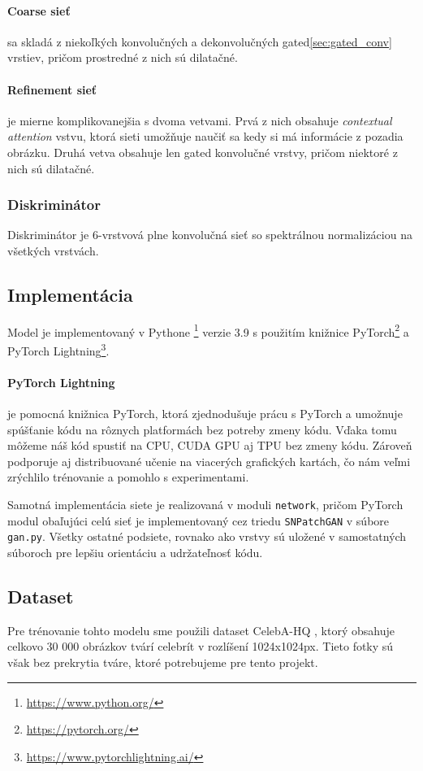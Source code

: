 \documentclass [11pt, a4paper]{article}
\begin{document}
	\paragraph{Coarse sieť} sa skladá z niekoľkých konvolučných a dekonvolučných gated\ref{sec:gated_conv} vrstiev, pričom prostredné z nich sú dilatačné.
	\paragraph{Refinement sieť} je mierne komplikovanejšia s dvoma vetvami. Prvá z nich obsahuje \textit{contextual attention} \cite{yu2018generative} vstvu, ktorá sieti umožňuje naučiť sa kedy si má  informácie z pozadia obrázku. Druhá vetva obsahuje len gated konvolučné vrstvy, pričom niektoré z nich sú dilatačné.
	
	\subsubsection{Diskriminátor}\label{sec:discriminator}
	Diskriminátor je 6-vrstvová plne konvolučná sieť so spektrálnou normalizáciou na všetkých vrstvách. 
	
	\subsection{Implementácia}
	Model je implementovaný v Pythone \footnote{\url{https://www.python.org/}} verzie 3.9 s použitím knižnice PyTorch\footnote{\url{https://pytorch.org/}} a PyTorch Lightning\footnote{\url{https://www.pytorchlightning.ai/}}.
	
	\paragraph{PyTorch Lightning} je pomocná knižnica PyTorch, ktorá zjednodušuje prácu s PyTorch a umožnuje spúšťanie kódu na rôznych platformách bez potreby zmeny kódu. Vďaka tomu môžeme náš kód spustiť na CPU, CUDA GPU aj TPU bez zmeny kódu. Zároveň podporuje aj distribuované učenie na viacerých grafických kartách, čo nám veľmi zrýchlilo trénovanie a pomohlo s experimentami.
	
	Samotná implementácia siete je realizovaná v moduli \texttt{network}, pričom PyTorch modul obaľujúci celú sieť je implementovaný cez triedu \texttt{SNPatchGAN} v súbore \texttt{gan.py}. Všetky ostatné podsiete, rovnako ako vrstvy sú uložené v samostatných súboroch pre lepšiu orientáciu a udržateľnosť kódu.
	
	
	\subsection{Dataset}\label{sec:dataset}
	Pre trénovanie tohto modelu sme použili dataset CelebA-HQ \cite{liu2015faceattributes}, ktorý obsahuje celkovo 30 000 obrázkov tvárí celebrít v rozlíšení 1024x1024px. Tieto fotky sú však bez prekrytia tváre, ktoré potrebujeme pre tento projekt.
	
\end{document}

